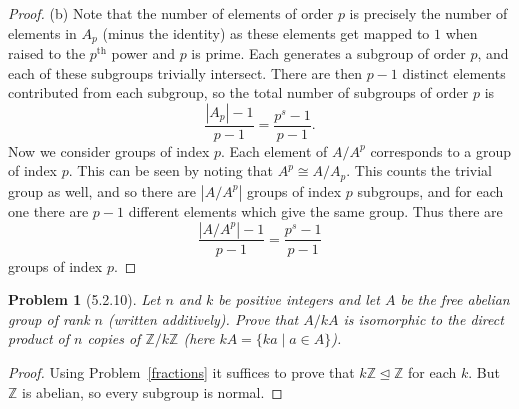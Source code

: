 \documentclass{article}
\newtheorem{problem}{Problem}
\newcommand{\normal}{\unlhd}
\begin{document}
\begin{proof}
(b) Note that the number of elements of order $p$ is precisely the number of elements in $A_p$ (minus the identity) as these  elements get mapped to $1$ when raised to the $p^{\text{th}}$ power and $p$ is prime. Each generates a subgroup of order $p$, and each of these subgroups trivially intersect. There are then $p-1$ distinct elements contributed from each subgroup, so the total number of subgroups of order $p$ is
\[
\frac{|A_p| - 1}{p-1} = \frac{p^s-1}{p-1}.
\]
Now we consider groups of index $p$. Each element of $A/A^p$ corresponds to a group of index $p$. This can be seen by noting that $A^p \cong A/A_p$. This counts the trivial group as well, and so there are $|A/A^p|$ groups of index $p$ subgroups, and for each one there are $p-1$ different elements which give the same group. Thus there are
\[
\frac{|A/A^p|-1}{p-1} = \frac{p^s-1}{p-1}
\]
groups of index $p$.
\end{proof}

\begin{problem}[5.2.10]
Let $n$ and $k$ be positive integers and let $A$ be the free abelian group of rank $n$ (written additively). Prove that $A/kA$ is isomorphic to the direct product of $n$ copies of $\mathbb{Z}/k\mathbb{Z}$ (here $kA = \{ka \mid a \in A\}$).
\end{problem}
\begin{proof}
Using Problem~\ref{fractions} it suffices to prove that $k\mathbb{Z} \normal \mathbb{Z}$ for each $k$. But $\mathbb{Z}$ is abelian, so every subgroup is normal.
\end{proof}
\end{document}
